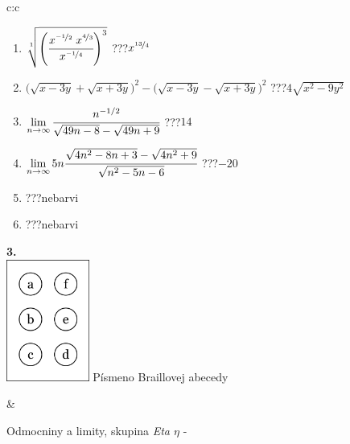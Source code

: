 \documentclass[10pt]{report}
\begin{document}
\begin{tabular}{c:c}
\begin{minipage}[c][104.5mm][t]{0.5\linewidth}
\begin{center}
\begin{minipage}{0.79\linewidth}
\begin{center}
\begin{varwidth}{\linewidth}
\begin{enumerate}
\small
\item $\sqrt[1]{\left(\cfrac{x^{\nicefrac{-1}{2}}\;x^{\nicefrac{4}{3}}}{x^{\nicefrac{-1}{4}}}\right)^{3}}$\quad \dotfill\; ???\;\dotfill \quad $x^{\nicefrac{13}{4}}$
\item {\footnotesize{\scriptsize$\big(\sqrt{x-3y}+\sqrt{x+3y}\big)^2-\big(\sqrt{x-3y}-\sqrt{x+3y}\big)^2$}\quad \dotfill\; ???\;\dotfill \quad $4\sqrt{x^2-9y^2}$}
\item $\lim\limits_{n\to\infty}\cfrac{n^{-1/2}}{\sqrt{49n-8}-\sqrt{49n+9}}$\quad \dotfill\; ???\;\dotfill \quad $14$
\item $\lim\limits_{n\to\infty}5n\cfrac{\sqrt{4n^2-8n+3}-\sqrt{4n^2+9}}{\sqrt{n^2-5n-6}}$\quad \dotfill\; ???\;\dotfill \quad $-20$
\item \quad \dotfill\; ???\;\dotfill \quad nebarvi
\item \quad \dotfill\; ???\;\dotfill \quad nebarvi
\end{enumerate}
\end{varwidth}
\end{center}
\end{minipage}
\begin{minipage}{0.20\linewidth}
\begin{center}
{\Huge\bfseries 3.} \\[2mm]
\includegraphics[height=40mm]{../images/braille.png}
{\small Písmeno Braillovej abecedy}
\end{center}
\end{minipage}
\end{center}
\end{minipage}
&
\begin{minipage}[c][104.5mm][t]{0.5\linewidth}
\begin{center}
\vspace{7mm}
{\huge Odmocniny a limity, skupina \textit{Eta $\eta$} -}\\[5mm]

\end{center}
\end{minipage}
\end{tabular}
\end{document}
